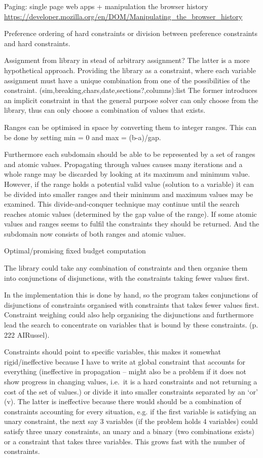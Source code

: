 Paging: single page web apps + manipulation the browser history \url{https://developer.mozilla.org/en/DOM/Manipulating_the_browser_history}

Preference ordering of hard constraints or division between preference constraints and hard constraints.

Assignment from library in stead of arbitrary assignment? The latter is a more hypothetical approach. Providing the library as a constraint, where each variable assignment must have a unique combination from one of the possibilities of the constraint.
(sim,breaking,chars,date,sections?,columns):list
The former introduces an implicit constraint in that the general purpose solver can only choose from the library, thus can only choose a combination of values that exists.

Ranges can be optimised in space by converting them to integer ranges. This can be done by setting min = 0 and max = (b-a)/gap.

Furthermore each subdomain should be able to be represented by a set of ranges and atomic values. Propagating through values causes many iterations and a whole range may be discarded by looking at its maximum and minimum value. However, if the range holds a potential valid value (solution to a variable) it can be divided into smaller ranges and their minimum and maximum values may be examined. This divide-and-conquer technique may continue until the search reaches atomic values (determined by the gap value of the range). If some atomic values and ranges seems to fulfil the constraints they should be returned. And the subdomain now consists of both ranges and atomic values.

Optimal/promising
fixed budget computation

The library could take any combination of constraints and then organise them into conjunctions of disjunctions, with the constraints taking fewer values first.

In the implementation this is done by hand, so the program takes conjunctions of disjunctions of constraints organised with constraints that takes fewer values first. Constraint weighing could also help organising the disjunctions and furthermore lead the search to concentrate on variables that is bound by these constraints. (p. 222 AIRussel).

Constraints should point to specific variables, this makes it somewhat rigid/ineffective because I have to write at global constraint that accounts for everything (ineffective in propagation -- might also be a problem if it does not show progress in changing values, i.e.\ it is a hard constraints and not returning a cost of the set of values.) or divide it into smaller constraints separated by an `or' (v). The latter is ineffective because there would should be a combination of constraints accounting for every situation, e.g. if the first variable is satisfying an unary constraint, the next say 3 variables (if the problem holds 4 variables) could satisfy three unary constraints, an unary and a binary (two combinations exists) or a constraint that takes three variables. This grows fast with the number of constraints.

